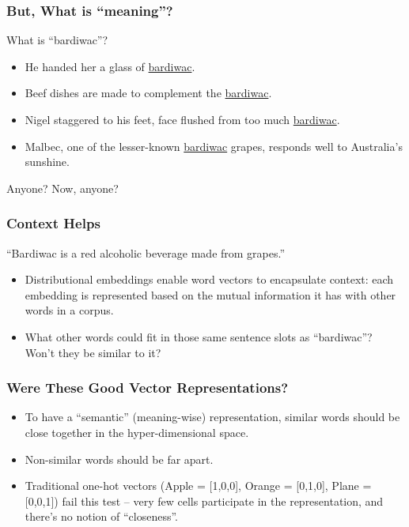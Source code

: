 \begin{frame}[fragile]\frametitle{But, What is ``meaning''?}
What is ``bardiwac''?

\begin{itemize}
\item He handed her a glass of \underline{bardiwac}.
\item Beef dishes are made to complement the \underline{bardiwac}.
\item Nigel staggered to his feet, face flushed from too much \underline{bardiwac}.
\item Malbec, one of the lesser-known \underline{bardiwac} grapes, responds well to Australia's sunshine.
\end{itemize}
Anyone? Now, anyone?
\end{frame}

\begin{frame}[fragile]\frametitle{Context Helps}
``Bardiwac is a red alcoholic beverage made from grapes.''

	\begin{itemize}
	\item Distributional embeddings enable word vectors to encapsulate context: each embedding is represented based on the mutual information it has with other words in a corpus.
	\item What other words could fit in those same sentence slots as ``bardiwac''? Won't they be similar to it?
	\end{itemize}
\end{frame}

\begin{frame}[fragile]\frametitle{Were These Good Vector Representations?}
	\begin{itemize}
	\item To have a ``semantic'' (meaning-wise) representation, similar words should be close together in the hyper-dimensional space.
	\item Non-similar words should be far apart.
	\item Traditional one-hot vectors (Apple = [1,0,0], Orange = [0,1,0], Plane = [0,0,1]) fail this test -- very few cells participate in the representation, and there's no notion of ``closeness''.
	\end{itemize}
\end{frame}

